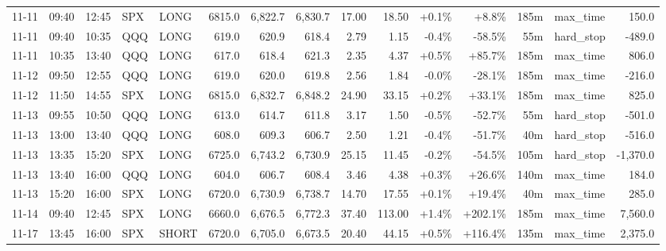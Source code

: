 \documentclass[11pt,a4paper,twoside]{article}
\begin{document}
\begin{landscape}
\begin{center}
\begin{longtable}{>{\color{txtmain}}l l l l l r r r r r r r r >{\color{txtmain}}l r}
11-11 & 09:40 & 12:45 & SPX & LONG & 6815.0 & 6,822.7 & 6,830.7 & 17.00 & 18.50 & \textcolor{wingreen}{+0.1\%} & \textcolor{wingreen}{+8.8\%} & 185m & max\_time & \textcolor{wingreen}{150.0} \\
11-11 & 09:40 & 10:35 & QQQ & LONG & 619.0 & 620.9 & 618.4 & 2.79 & 1.15 & \textcolor{lossred}{-0.4\%} & \textcolor{lossred}{-58.5\%} & 55m & hard\_stop & \textcolor{lossred}{-489.0} \\
11-11 & 10:35 & 13:40 & QQQ & LONG & 617.0 & 618.4 & 621.3 & 2.35 & 4.37 & \textcolor{wingreen}{+0.5\%} & \textcolor{wingreen}{+85.7\%} & 185m & max\_time & \textcolor{wingreen}{806.0} \\
11-12 & 09:50 & 12:55 & QQQ & LONG & 619.0 & 620.0 & 619.8 & 2.56 & 1.84 & \textcolor{lossred}{-0.0\%} & \textcolor{lossred}{-28.1\%} & 185m & max\_time & \textcolor{lossred}{-216.0} \\
11-12 & 11:50 & 14:55 & SPX & LONG & 6815.0 & 6,832.7 & 6,848.2 & 24.90 & 33.15 & \textcolor{wingreen}{+0.2\%} & \textcolor{wingreen}{+33.1\%} & 185m & max\_time & \textcolor{wingreen}{825.0} \\
11-13 & 09:55 & 10:50 & QQQ & LONG & 613.0 & 614.7 & 611.8 & 3.17 & 1.50 & \textcolor{lossred}{-0.5\%} & \textcolor{lossred}{-52.7\%} & 55m & hard\_stop & \textcolor{lossred}{-501.0} \\
11-13 & 13:00 & 13:40 & QQQ & LONG & 608.0 & 609.3 & 606.7 & 2.50 & 1.21 & \textcolor{lossred}{-0.4\%} & \textcolor{lossred}{-51.7\%} & 40m & hard\_stop & \textcolor{lossred}{-516.0} \\
11-13 & 13:35 & 15:20 & SPX & LONG & 6725.0 & 6,743.2 & 6,730.9 & 25.15 & 11.45 & \textcolor{lossred}{-0.2\%} & \textcolor{lossred}{-54.5\%} & 105m & hard\_stop & \textcolor{lossred}{-1,370.0} \\
11-13 & 13:40 & 16:00 & QQQ & LONG & 604.0 & 606.7 & 608.4 & 3.46 & 4.38 & \textcolor{wingreen}{+0.3\%} & \textcolor{wingreen}{+26.6\%} & 140m & max\_time & \textcolor{wingreen}{184.0} \\
11-13 & 15:20 & 16:00 & SPX & LONG & 6720.0 & 6,730.9 & 6,738.7 & 14.70 & 17.55 & \textcolor{wingreen}{+0.1\%} & \textcolor{wingreen}{+19.4\%} & 40m & max\_time & \textcolor{wingreen}{285.0} \\
11-14 & 09:40 & 12:45 & SPX & LONG & 6660.0 & 6,676.5 & 6,772.3 & 37.40 & 113.00 & \textcolor{wingreen}{+1.4\%} & \textcolor{wingreen}{+202.1\%} & 185m & max\_time & \textcolor{wingreen}{7,560.0} \\
11-17 & 13:45 & 16:00 & SPX & SHORT & 6720.0 & 6,705.0 & 6,673.5 & 20.40 & 44.15 & \textcolor{wingreen}{+0.5\%} & \textcolor{wingreen}{+116.4\%} & 135m & max\_time & \textcolor{wingreen}{2,375.0} \\

\end{longtable}
\end{center}
\end{landscape}
\end{document}
